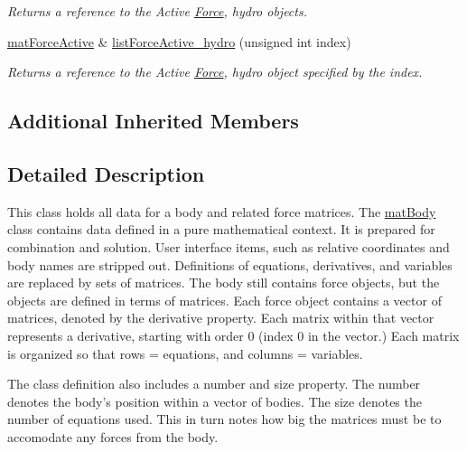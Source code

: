 \begin{DoxyCompactItemize}
\begin{DoxyCompactList}\small\item\em Returns a reference to the Active \hyperlink{classosea_1_1ofreq_1_1_force}{Force}, hydro objects. \end{DoxyCompactList}\item 
\hyperlink{classosea_1_1ofreq_1_1mat_force_active}{mat\-Force\-Active} \& \hyperlink{classosea_1_1ofreq_1_1mat_body_aa1c0587dc82254db28ff71a9cc3261d7}{list\-Force\-Active\-\_\-hydro} (unsigned int index)
\begin{DoxyCompactList}\small\item\em Returns a reference to the Active \hyperlink{classosea_1_1ofreq_1_1_force}{Force}, hydro object specified by the index. \end{DoxyCompactList}\end{DoxyCompactItemize}
\subsection*{Additional Inherited Members}


\subsection{Detailed Description}
This class holds all data for a body and related force matrices. The \hyperlink{classosea_1_1ofreq_1_1mat_body}{mat\-Body} class contains data defined in a pure mathematical context. It is prepared for combination and solution. User interface items, such as relative coordinates and body names are stripped out. Definitions of equations, derivatives, and variables are replaced by sets of matrices. The body still contains force objects, but the objects are defined in terms of matrices. Each force object contains a vector of matrices, denoted by the derivative property. Each matrix within that vector represents a derivative, starting with order 0 (index 0 in the vector.) Each matrix is organized so that rows = equations, and columns = variables.

The class definition also includes a number and size property. The number denotes the body's position within a vector of bodies. The size denotes the number of equations used. This in turn notes how big the matrices must be to accomodate any forces from the body. 

